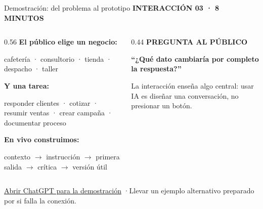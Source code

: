 \documentclass[aspectratio=169,11pt]{beamer}
\newcommand{\kicker}[1]{{\color{gold}\scriptsize\bfseries\MakeUppercase{#1}}}
\newcommand{\muted}[1]{{\color{muted}#1}}
\begin{document}
\begin{frame}[label=demo]{Demostración: del problema al prototipo}
\kicker{Interacción 03 · 8 minutos}
\vspace{0.25cm}

\begin{columns}[T,onlytextwidth]
\begin{column}{0.56\textwidth}
{\large\bfseries El público elige un negocio:}\par
\small cafetería · consultorio · tienda · despacho · taller
\vspace{0.32cm}

{\large\bfseries Y una tarea:}\par
\small responder clientes · cotizar · resumir ventas · crear campaña · documentar proceso
\vspace{0.42cm}

{\color{forest}\bfseries En vivo construimos:}\par
\small contexto $\rightarrow$ instrucción $\rightarrow$ primera salida $\rightarrow$ crítica $\rightarrow$ versión útil
\end{column}
\begin{column}{0.44\textwidth}
\kicker{Pregunta al público}\par\vspace{0.18cm}
{\large\bfseries “¿Qué dato cambiaría por completo la respuesta?”}\par
\vspace{0.38cm}
\small\muted{La interacción enseña algo central: usar IA es diseñar una conversación, no presionar un botón.}
\end{column}
\end{columns}

\vfill
{\scriptsize\href{https://chatgpt.com/}{Abrir ChatGPT para la demostración} \quad·\quad Llevar un ejemplo alternativo preparado por si falla la conexión.}
\vspace{0.35cm}
\end{frame}
\end{document}
